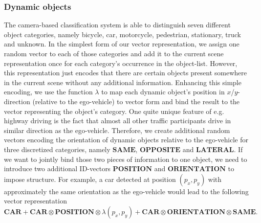 \subsubsection{Dynamic objects}
The camera-based classification system is able to distinguish seven different object categories, namely bicycle, car, motorcycle, pedestrian, stationary, truck and unknown.
In the simplest form of our vector representation, we assign one random vector to each of those categories and add it to the current scene representation once for each category's occurrence in the object-list.
However, this representation just encodes that there are certain objects present somewhere in the current scene without any additional information.
Enhancing this simple encoding, we use the function $\lambda$ to map each dynamic object's position in $x$/$y$-direction (relative to the ego-vehicle) to vector form and bind the result to the vector representing the object's category.
One quite unique feature of e.g. highway driving is the fact that almost all other traffic participants drive in similar direction as the ego-vehicle.
Therefore, we create additional random vectors encoding the orientation of dynamic objects relative to the ego-vehicle for three discretized categories, namely $\mathbf{SAME}$, $\mathbf{OPPOSITE}$ and $\mathbf{LATERAL}$.
If we want to jointly bind those two pieces of information to one object, we need to introduce two additional ID-vectors $\mathbf{POSITION}$ and $\mathbf{ORIENTATION }$ to impose structure.
For example, a car detected at position $\left(p_x,p_y\right)$ with approximately the same orientation as the ego-vehicle would lead to the following vector representation
\[
\mathbf{CAR} + \mathbf{CAR}\otimes\mathbf{POSITION}\otimes\lambda\left(p_x,p_y\right) + \mathbf{CAR}\otimes\mathbf{ORIENTATION}\otimes\mathbf{SAME}.
\]
